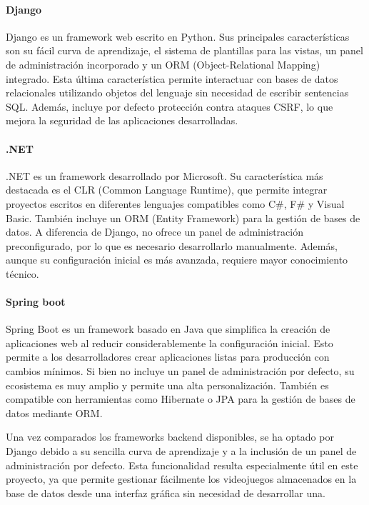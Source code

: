 \paragraph{Django}
Django \cite{wikipedia_django} es un framework web escrito en Python. Sus principales características son su fácil curva de aprendizaje, el sistema 
de plantillas para las vistas, un panel de administración incorporado y un ORM (Object-Relational Mapping) integrado. 
Esta última característica permite interactuar con bases de datos relacionales utilizando objetos del lenguaje sin necesidad 
de escribir sentencias SQL. Además, incluye por defecto protección contra ataques CSRF, lo que mejora la seguridad de las 
aplicaciones desarrolladas.

\paragraph{.NET}
.NET \cite{wikipedia_dotnet} es un framework desarrollado por Microsoft. Su característica más destacada es el CLR (Common Language Runtime), 
que permite integrar proyectos escritos en diferentes lenguajes compatibles como C\#, F\# y Visual Basic. 
También incluye un ORM (Entity Framework) para la gestión de bases de datos. A diferencia de Django, no ofrece un panel 
de administración preconfigurado, por lo que es necesario desarrollarlo manualmente. Además, aunque su configuración
inicial es más avanzada, requiere mayor conocimiento técnico.

\paragraph{Spring boot}
Spring Boot \cite{ibm_springboot} es un framework basado en Java que simplifica la creación de aplicaciones web al reducir considerablemente 
la configuración inicial. Esto permite a los desarrolladores crear aplicaciones listas para producción con cambios mínimos. 
Si bien no incluye un panel de administración por defecto, su ecosistema es muy amplio y permite una alta personalización. 
También es compatible con herramientas como Hibernate o JPA para la gestión de bases de datos mediante ORM.


Una vez comparados los frameworks backend disponibles, se ha optado por Django debido a su sencilla curva de aprendizaje y a la inclusión 
de un panel de administración por defecto. Esta funcionalidad resulta especialmente útil en este proyecto, ya que permite 
gestionar fácilmente los videojuegos almacenados en la base de datos desde una interfaz gráfica sin necesidad de desarrollar una.